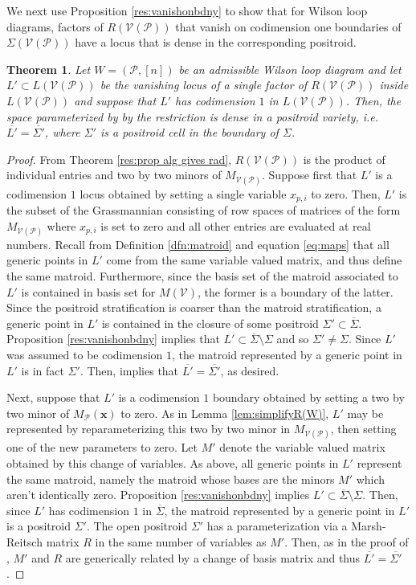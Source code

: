 \documentclass[11pt]{article}
\newcommand{\cP}{\mathcal{P}}
\newcommand{\cV}{\mathcal{V}}
\newcommand{\VP}{\cV(\cP)}
\newtheorem{thm}{Theorem}[section]
\theoremstyle{remark}
\theoremstyle{definition}
\begin{document}
We next use Proposition \ref{res:vanishonbdny} to show that for Wilson loop diagrams, factors of $R(\VP)$ that vanish on codimension one boundaries of $\Sigma(\VP)$ have a locus that is dense in the corresponding positroid.

\begin{thm}\label{res:polesonboundaries}
Let $W=(\mathcal{P},[n])$ be an admissible Wilson loop diagram and let $L' \subset L(\VP)$ be the vanishing locus of a single factor of $R(\VP)$ inside $L(\VP)$ and suppose that $L'$ has codimension $1$ in $L(\VP)$. Then, the space parameterized by by the restriction is dense in a positroid variety, i.e. $\overline{L'}= \overline{\Sigma'}$, where $\Sigma'$ is a positroid cell in the boundary of $\Sigma$. \end{thm}

\begin{proof}
From Theorem \ref{res:prop alg gives rad}, $R(\VP)$ is the product of individual entries and two by two minors of $M_{\VP}$. Suppose first that $L'$ is a codimension $1$ locus obtained by setting a single variable $x_{p,i}$ to zero. Then, $L'$ is the subset of the Grassmannian consisting of row spaces of matrices of the form $M_{\VP}$ where $x_{p,i}$ is set to zero and all other entries are evaluated at real numbers.  Recall from Definition \ref{dfn:matroid} and equation \eqref{eq:maps} that all generic points in $L'$ come from the same variable valued matrix, and thus define the same matroid. Furthermore, since the basis set of the matroid associated to $L'$ is contained in basis set for $M(\cV)$, the former is a boundary of the latter. Since the positroid stratification is coarser than the matroid stratification, a generic point in $L'$ is contained in the closure of some positroid $\Sigma' \subset \overline{\Sigma}$. Proposition \ref{res:vanishonbdny} implies that $L' \subset \overline{\Sigma} \setminus \Sigma$ and so $\Sigma' \neq \Sigma$. Since $L'$ was assumed to be codimension $1$, the matroid represented by a generic point in $L'$ is in fact $\Sigma'$. Then, \cite[Theorem 5.1]{basisshapeloci} implies that $\overline{L'} = \overline{\Sigma'}$, as desired. 

Next, suppose that $L'$ is a codimension $1$ boundary obtained by setting a two by two minor of $M_{\mathcal{P}}(\mathbf{x})$ to zero. As in Lemma \ref{lem:simplifyR(W)}, $L'$ may be represented by reparameterizing this two by two minor in $M_{\VP}$, then setting one of the new parameters to zero. Let $M'$ denote the variable valued matrix obtained by this change of variables. As above, all generic points in $L'$ represent the same matroid, namely the matroid whose bases are the minors $M'$ which aren't identically zero. Proposition \ref{res:vanishonbdny} implies $L' \subset \overline{\Sigma} \setminus \Sigma$. Then, since $L'$ has codimension $1$ in $\overline{\Sigma}$, the matroid represented by a generic point in $L'$ is a positroid $\Sigma'$. The open positroid $\Sigma'$ has a parameterization via a Marsh-Reitsch matrix $R$ in the same number of variables as $M'$. Then, as in the proof of \cite[Theorem 5.1]{basisshapeloci}, $M'$ and $R$ are generically related by a change of basis matrix and thus $\overline{L'} = \overline{\Sigma'}$.
\end{proof}
\end{document}
